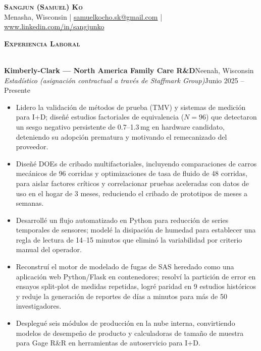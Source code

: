 \documentclass[a4paper]{article}
\newcommand{\lineunder}{
    \vspace*{-8pt} \\
    \hspace*{-18pt} \hrulefill \\
}
\newcommand{\header}[1]{
    \Needspace{4\baselineskip}
    {\hspace*{-18pt}\vspace*{5pt} \textsc{#1}}
    \vspace*{-6pt} \lineunder
}
\newcommand{\role}[4]{
    \Needspace{7\baselineskip}
    \vspace{2pt}
    \textbf{#1}\hfill #2\\
    \textit{#3}\hfill #4\\[-3pt]
}
\begin{document}
\vspace*{-40pt}

\vspace*{-10pt}
\begin{center}
    {\Huge \scshape \textbf{Sangjun (Samuel) Ko}}\\
    Menasha, Wisconsin
    | \href{mailto:samuelkocho.sk@gmail.com}{samuelkocho.sk@gmail.com}
    | \href{https://www.linkedin.com/in/sangjunko}{www.linkedin.com/in/sangjunko}
\end{center}
\vspace*{-8pt}

\header{\textbf{Experiencia Laboral}}
\vspace{1mm}

\role{Kimberly-Clark --- North America Family Care R\&D}{Neenah, Wisconsin}
{Estadístico (asignación contractual a través de Staffmark Group)}{Junio 2025 -- Presente}
\begin{itemize}[noitemsep]
    \item Lidero la validación de métodos de prueba (TMV) y sistemas de medición para I+D; diseñé estudios factoriales de equivalencia ($N=96$) que detectaron un sesgo negativo persistente de 0.7--1.3\,mg en hardware candidato, deteniendo su adopción prematura y motivando el remecanizado del proveedor.
    \item Diseñé DOEs de cribado multifactoriales, incluyendo comparaciones de carros mecánicos de 96 corridas y optimizaciones de tasa de fluido de 48 corridas, para aislar factores críticos y correlacionar pruebas aceleradas con datos de uso en el hogar de 3 meses, reduciendo el cribado de prototipos de meses a semanas.
    \item Desarrollé un flujo automatizado en Python para reducción de series temporales de sensores; modelé la disipación de humedad para establecer una regla de lectura de 14--15 minutos que eliminó la variabilidad por criterio manual del operador.
    \item Reconstruí el motor de modelado de fugas de SAS heredado como una aplicación web Python/Flask en contenedores; resolví la partición de error en ensayos split-plot de medidas repetidas, logré paridad en 9 estudios históricos y reduje la generación de reportes de días a minutos para más de 50 investigadores.
    \item Desplegué seis módulos de producción en la nube interna, convirtiendo modelos de desempeño de producto y calculadoras de tamaño de muestra para Gage R\&R en herramientas de autoservicio para I+D.
\end{itemize}
\end{document}
